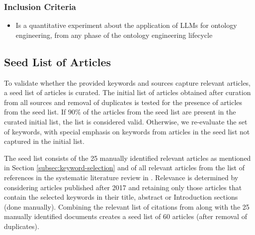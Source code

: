 \documentclass[a4paper,colorinlistoftodos]{article}
\begin{document}
\subsubsection{Inclusion Criteria}
\label{subsubsec:inclusion-criteria}

\begin{itemize}
  \item Is a quantitative experiment about the application of LLMs for
    ontology engineering, from any phase of the ontology engineering lifecycle
\end{itemize}

\subsection{Seed List of Articles}
\label{subsec:seed-list}

To validate whether the provided keywords and sources capture relevant
articles, a seed list of articles is curated. The initial list of articles
obtained after curation from all sources and removal of duplicates is tested
for the presence of articles from the seed list. If $90\%$ of the articles
from the seed list are present in the curated initial list, the list is
considered valid. Otherwise, we re-evaluate the set of keywords, with special
emphasis on keywords from articles in the seed list not captured in the
initial list.

The seed list consists of the 25 manually identified relevant articles as
mentioned in Section \ref{subsec:keyword-selection} and of all relevant
articles from the list of references in the systematic literature review in
\citet{li2025LargeLanguageModels}. Relevance is determined by considering
articles published after 2017 and retaining only those articles that contain
the selected keywords in their title, abstract or Introduction sections (done
manually). Combining the relevant list of citations from
\citet{li2025LargeLanguageModels} along with the 25 manually identified
documents creates a seed list of 60 articles (after removal of duplicates).




\end{document}
